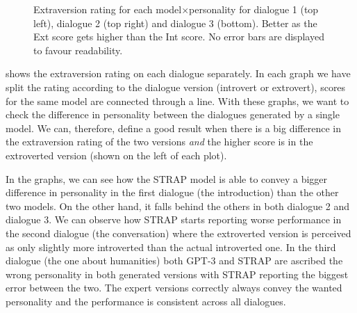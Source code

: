 \documentclass[nomenclature, english, biblatex]{kththesis}
\begin{document}
\begin{figure}[ht]
    \centering
    \begin{adjustbox}{max width=\textwidth}
        \begin{adjustbox}{max width=0.5\textwidth}
            
        \end{adjustbox}
        \begin{adjustbox}{max width=0.5\textwidth}
            
        \end{adjustbox}       
    \end{adjustbox} 
    \begin{adjustbox}{max width=0.5\textwidth}
        
    \end{adjustbox}   
    \caption{Extraversion rating for each model$\times$personality for dialogue 1 (top left), dialogue 2 (top right) and dialogue 3 (bottom). Better as the Ext score gets higher than the Int score. No error bars are displayed to favour readability.}
    \label{fig:pilot_single_dialogues}
\end{figure}
 shows the extraversion rating on each dialogue separately. In each graph we have split the rating according to the dialogue version (introvert or extrovert), scores for the same model are connected through a line. With these graphs, we want to check the difference in personality between the dialogues generated by a single model. We can, therefore, define a good result when there is a big difference in the extraversion rating of the two versions \textit{and} the higher score is in the extroverted version (shown on the left of each plot). 

In the graphs, we can see how the STRAP model is able to convey a bigger difference in personality in the first dialogue (the introduction) than the other two models. On the other hand, it falls behind the others in both dialogue 2 and dialogue 3. We can observe how STRAP starts reporting worse performance in the second dialogue (the conversation) where the extroverted version is perceived as only slightly more introverted than the actual introverted one. In the third dialogue (the one about humanities) both GPT-3 and STRAP are ascribed the wrong personality in both generated versions with STRAP reporting the biggest error between the two. The expert versions correctly always convey the wanted personality and the performance is consistent across all dialogues.
\end{document}
